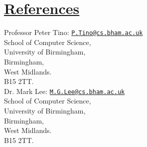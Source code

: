 \documentclass[11pt]{article}
\begin{document}
				
	\vspace{-20pt}
	\hspace{-100pt}\section*{\underline{References}}	
				\begin{multicols}{2}
					\noindent
					Professor Peter Tino:  \href{mailto:P.Tino@cs.bham.ac.uk}{\nolinkurl{P.Tino@cs.bham.ac.uk}}\\
					School of Computer Science,\\
					University of Birmingham,\\
					Birmingham, \\
					West Midlands.\\
					B15 2TT.\\
	
					\noindent
					Dr. Mark Lee: \href{mailto:M.G.Lee@cs.bham.ac.uk}{\nolinkurl{M.G.Lee@cs.bham.ac.uk}}\\
					School of Computer Science,\\
					University of Birmingham,\\
					Birmingham,\\
					West Midlands.\\
					B15 2TT.\\
				\end{multicols}
\end{document}
